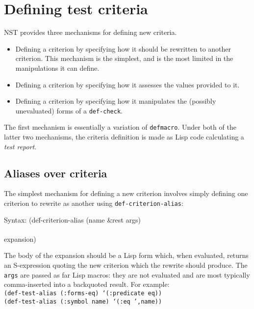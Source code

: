 \section{Defining test criteria}
NST provides three mechanisms for defining new criteria.
\begin{itemize}
\item Defining a criterion by specifying how it should be rewritten to
  another criterion.  This mechanism is the simplest, and is the most
  limited in the manipulations it can define.
\item Defining a criterion by specifying how it assesses the values
  provided to it.
\item Defining a criterion by specifying how it manipulates the
  (possibly unevaluated) forms of a \texttt{def-check}.
\end{itemize}
The first mechanism is essentially a variation of \texttt{defmacro}.
Under both of the latter two mechanisms, the criteria definition is
made as Lisp code calculating a \emph{test report}.

\subsection{Aliases over criteria}
\label{sec:def-criterion-alias}
The simplest mechanism for defining a new criterion involves simply
defining one criterion to rewrite as another using
\texttt{def-criterion-alias}:
%
{\ttfamily\begin{tabbing}
\textrm{Syntax: 
}(de\=f-criterion-alias (name \&rest args)
\\ \> [ documentation ]
\\ \> expansion)
\end{tabbing}}
The body of the expansion should be a Lisp form which, when evaluated,
returns an S-expression quoting the new criterion which the rewrite
should produce.  The \texttt{args} are passed as far Lisp macros: they
are not evaluated and are most typically comma-inserted into a
backquoted result.  For example:
\\ \texttt{(def-test-alias (:forms-eq) `(:predicate eq))}
\\ \texttt{(def-test-alias (:symbol name) `(:eq ',name))}

